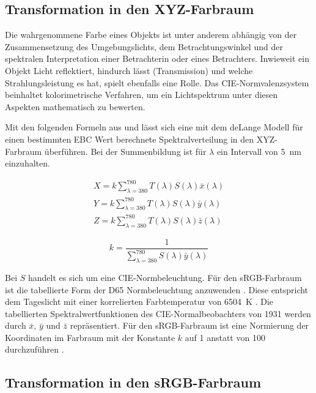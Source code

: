 \documentclass[10pt,a4paper,DIV=12,parskip=half]{scrarticle}
\begin{document}
\subsection*{Transformation in den XYZ-Farbraum}

Die wahrgenommene Farbe eines Objekts ist unter anderem abhängig von der Zusammensetzung des Umgebungslichts, dem Betrachtungswinkel und der spektralen Interpretation einer Betrachterin oder eines Betrachters. Inwieweit ein Objekt Licht reflektiert, hindurch lässt (Transmission) und welche Strahlungsleistung es hat, spielt ebenfalls eine Rolle. Das CIE-Normvalenzsystem beinhaltet kolorimetrische Verfahren, um ein Lichtspektrum unter diesen Aspekten mathematisch zu bewerten. \autocite{ASTM2022}

Mit den folgenden Formeln aus \textcite{ASTM2022} und \textcite{ASBC2011} lässt sich eine mit dem deLange Modell für einen bestimmten EBC Wert berechnete Spektralverteilung in den XYZ-Farbraum überführen. Bei der Summenbildung ist für $\lambda$ ein Intervall von 5~nm einzuhalten.

\begin{equation*}
	\begin{gathered}
		X = k \sum_{\lambda=380}^{780} T(\lambda) S(\lambda) \bar{x}(\lambda) \\
		Y = k \sum_{\lambda=380}^{780} T(\lambda) S(\lambda) \bar{y}(\lambda) \\
		Z = k \sum_{\lambda=380}^{780} T(\lambda) S(\lambda) \bar{z}(\lambda)
	\end{gathered}
\end{equation*}

\begin{equation*}
	k = \frac{1}{\sum_{\lambda=380}^{780} S(\lambda) \bar{y}(\lambda)}
\end{equation*}

Bei $S$ handelt es sich um eine CIE-Normbeleuchtung. Für den sRGB-Farbraum ist die tabellierte Form der D65 Normbeleuchtung anzuwenden \autocites{W3C2015}{CIE2022}. Diese entspricht dem Tageslicht mit einer korrelierten Farbtemperatur von 6504~K \autocite{ASTM2022}. Die tabellierten Spektralwertfunktionen des CIE-Normalbeobachters von 1931 \autocite{CIE2018} werden durch $\bar{x}$, $\bar{y}$ und $\bar{z}$ repräsentiert. Für den sRGB-Farbraum ist eine Normierung der Koordinaten im Farbraum mit der Konstante $k$ auf 1 anstatt von 100 durchzuführen \autocite{W3C2015}.

\subsection*{Transformation in den sRGB-Farbraum}
\end{document}
